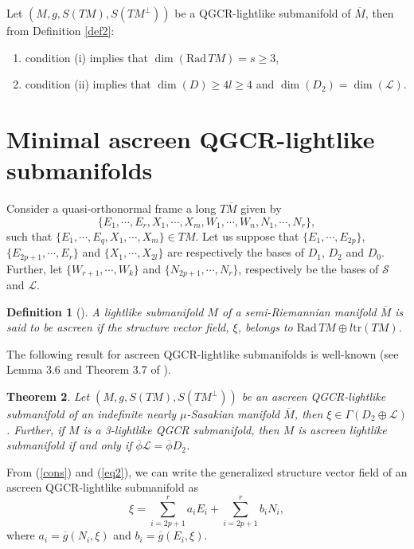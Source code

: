 \documentclass[reqno, 12pt]{amsart}
\numberwithin{equation}{section}
\newtheorem{theorem}{Theorem}[section]
\newtheorem{definition}[theorem]{Definition}
\begin{document}
Let  $(M,g,S(TM),S(TM^\perp))$ be a QGCR-lightlike submanifold  of $\overline{M}$, then from  Definition \ref{def2}:
          \begin{enumerate}
               \item condition (i) implies that $\dim(\mathrm{Rad}\, TM)=s\ge  3$,
               \item condition (ii) implies that $\dim(D)\ge  4l\ge 4$ and $\dim(D_2)= \dim(\mathcal{L})$. 
          \end{enumerate}       

\section{Minimal ascreen QGCR-lightlike submanifolds}\label{minimal} 
Consider a quasi-orthonormal frame a long $T\overline{M}$ given by 
\begin{equation}\label{cons}
\{E_{1},\cdots, E_{r} , X_{1} ,\cdots, X_{m}, W_{1},\cdots,W_{n}, N_{1},\cdots, N_{r}\},
 \end{equation}
 such that $\{E_{1},\cdots, E_{q} , X_{1} ,\cdots, X_{m}\}\in TM$. Let us suppose that $\{E_{1},\cdots, E_{2p}\}$, $\{E_{2p+1},\cdots, E_{r}\}$ and $\{X_{1} ,\cdots, X_{2l}\}$ are respectively the  bases of $D_{1}$, $D_{2}$ and $D_{0}$. Further, let $\{W_{r+1},\cdots,W_{k}\}$ and $\{N_{2p+1},\cdots,N_{r}\}$, respectively be the bases of $\mathcal{S}$ and $\mathcal{L}$.

\begin{definition}[\cite{dh1}]\label{def3}  {\rm
A lightlike submanifold $M$ of a semi-Riemannian manifold $\overline{M}$ is said to be \textit{ascreen} if the structure vector field, $\xi$, belongs to $\mathrm{Rad}\, TM \oplus l\mathrm{tr}(T M)$.
}
\end{definition}
The following result for ascreen QGCR-lightlike submanifolds is well-known (see Lemma 3.6 and Theorem 3.7 of \cite{ms}).

\begin{theorem}\label{asc}
 Let  $(M,g,S(TM),S(TM^\perp))$ be an ascreen QGCR-lightlike submanifold of an indefinite nearly $\mu$-Sasakian manifold $\overline{M}$, then $\xi\in\Gamma(D_{2}\oplus\mathcal{L})$. Further, if $M$ is a 3-lightlike QGCR submanifold, then $M$ is ascreen lightlike submanifold if and only if $\overline{\phi}\mathcal{L}=\overline{\phi} D_{2}$.
\end{theorem} 
 From (\ref{cons}) and  (\ref{eq2}), we can write the generalized structure vector field of an ascreen QGCR-lightlike submanifold as  
 \begin{equation}\label{T1}
  \xi=\sum_{i=2p+1}^{r}a_{i}E_{i}+\sum_{i=2p+1}^{r}b_{i}N_{i},
 \end{equation}
where $a_{i}=\overline{g}(N_{i},\xi)$ and $b_{i}=\overline{g}(E_{i},\xi).$
 
\end{document}

